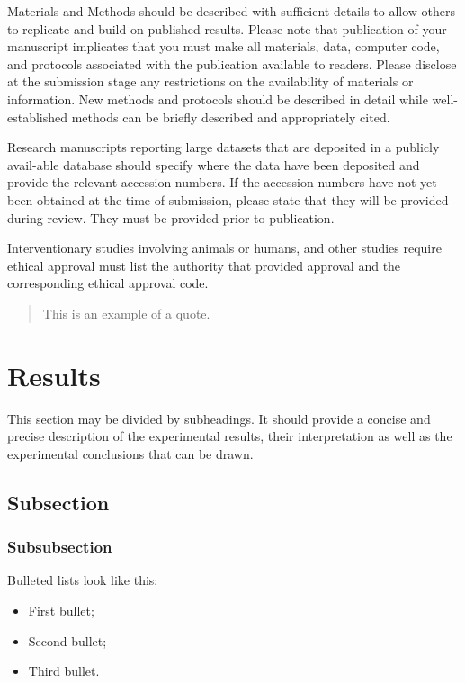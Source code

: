 \documentclass[engproc,conferenceproceedings,submit,pdftex,moreauthors]{Definitions/mdpi}
\begin{document}
Materials and Methods should be described with sufficient details to allow others to replicate and build on published results. Please note that publication of your manuscript implicates that you must make all materials, data, computer code, and protocols associated with the publication available to readers. Please disclose at the submission stage any restrictions on the availability of materials or information. New methods and protocols should be described in detail while well-established methods can be briefly described and appropriately cited.

Research manuscripts reporting large datasets that are deposited in a publicly avail-able database should specify where the data have been deposited and provide the relevant accession numbers. If the accession numbers have not yet been obtained at the time of submission, please state that they will be provided during review. They must be provided prior to publication.

Interventionary studies involving animals or humans, and other studies require ethical approval must list the authority that provided approval and the corresponding ethical approval code.
\begin{quote}
This is an example of a quote.
\end{quote}

\section{Results}

This section may be divided by subheadings. It should provide a concise and precise description of the experimental results, their interpretation as well as the experimental conclusions that can be drawn.
\subsection{Subsection}
\subsubsection{Subsubsection}

Bulleted lists look like this:
\begin{itemize}
\item	First bullet;
\item	Second bullet;
\item	Third bullet.
\end{itemize}
\end{document}
